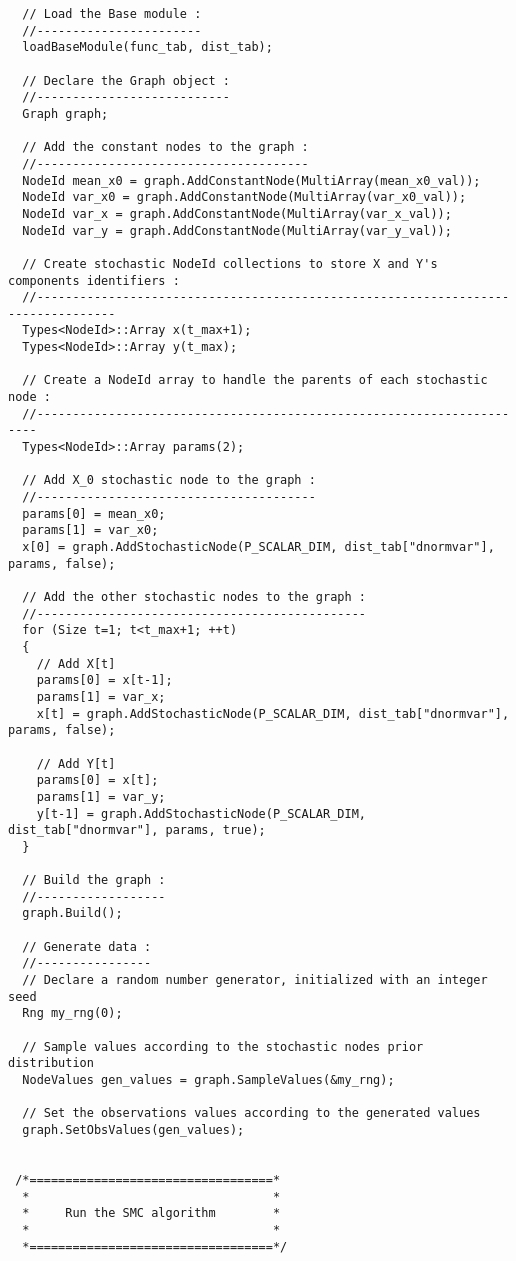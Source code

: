 \begin{lstlisting}
  // Load the Base module :
  //-----------------------
  loadBaseModule(func_tab, dist_tab);

  // Declare the Graph object :
  //---------------------------
  Graph graph;

  // Add the constant nodes to the graph :
  //--------------------------------------
  NodeId mean_x0 = graph.AddConstantNode(MultiArray(mean_x0_val));
  NodeId var_x0 = graph.AddConstantNode(MultiArray(var_x0_val));
  NodeId var_x = graph.AddConstantNode(MultiArray(var_x_val));
  NodeId var_y = graph.AddConstantNode(MultiArray(var_y_val));

  // Create stochastic NodeId collections to store X and Y's components identifiers :
  //---------------------------------------------------------------------------------
  Types<NodeId>::Array x(t_max+1);
  Types<NodeId>::Array y(t_max);

  // Create a NodeId array to handle the parents of each stochastic node :
  //----------------------------------------------------------------------
  Types<NodeId>::Array params(2);

  // Add X_0 stochastic node to the graph :
  //---------------------------------------
  params[0] = mean_x0;
  params[1] = var_x0;
  x[0] = graph.AddStochasticNode(P_SCALAR_DIM, dist_tab["dnormvar"], params, false);

  // Add the other stochastic nodes to the graph :
  //----------------------------------------------
  for (Size t=1; t<t_max+1; ++t)
  {
    // Add X[t]
    params[0] = x[t-1];
    params[1] = var_x;
    x[t] = graph.AddStochasticNode(P_SCALAR_DIM, dist_tab["dnormvar"], params, false);

    // Add Y[t]
    params[0] = x[t];
    params[1] = var_y;
    y[t-1] = graph.AddStochasticNode(P_SCALAR_DIM, dist_tab["dnormvar"], params, true);
  }

  // Build the graph :
  //------------------
  graph.Build();

  // Generate data :
  //----------------
  // Declare a random number generator, initialized with an integer seed
  Rng my_rng(0);

  // Sample values according to the stochastic nodes prior distribution
  NodeValues gen_values = graph.SampleValues(&my_rng);

  // Set the observations values according to the generated values
  graph.SetObsValues(gen_values);


 /*==================================*
  *                                  *
  *     Run the SMC algorithm        *
  *                                  *
  *==================================*/


\end{lstlisting}
